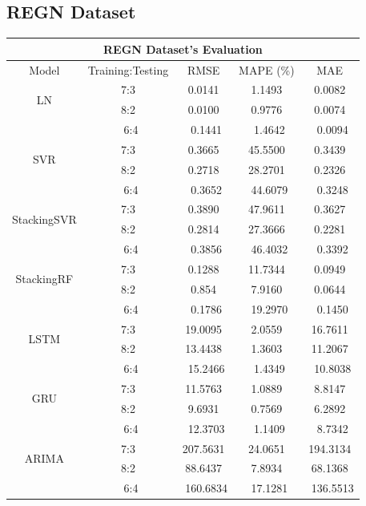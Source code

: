 \documentclass{ieeeojies}
\begin{document}
\subsection{REGN Dataset} 
\begin{table}[H]
    \centering
    \begin{tabular}{|c|c|c|c|c|}
         \hline
         \multicolumn{5}{|c|}{\textbf{REGN Dataset's Evaluation}}\\
         \hline
         \centering Model & Training:Testing & RMSE & MAPE (\%) & MAE\\
         \hline
         \multirow{2}{*}{LN} & 7:3 & 0.0141 & 1.1493 & 0.0082 \\ & 8:2 & 0.0100 & 0.9776 & 0.0074 \\ & \ 6:4} & \ 0.1441 & \ 1.4642 & \ 0.0094\\
         \hline
         \multirow{2}{*}{SVR} & 7:3 & 0.3665 & 45.5500 &  0.3439\\ & 8:2 & 0.2718 & 28.2701 & 0.2326 \\ & \ 6:4} & \ 0.3652 & \ 44.6079 & \ 0.3248\\
         \hline
         \multirow{2}{*}{StackingSVR} & 7:3 & 0.3890 & 47.9611 & 0.3627 \\ & 8:2 & 0.2814 & 27.3666 & 0.2281 \\ & \ 6:4} & \ 0.3856 & \ 46.4032 & \ 0.3392\\
          \hline
        \multirow{2}{*}{StackingRF} & 7:3 & 0.1288 & 11.7344 & 0.0949 \\ & 8:2 & 0.854 & 7.9160 & 0.0644 \\ & \ 6:4} & \ 0.1786 & \ 19.2970 & \ 0.1450\\
        \hline
         \multirow{2}{*}{LSTM} & 7:3 & 19.0095 & 2.0559 & 16.7611 \\ & 8:2 & 13.4438 & 1.3603 & 11.2067 \\ & \ 6:4} & \ 15.2466 & \ 1.4349 & \ 10.8038\\
         \hline
         \multirow{2}{*}{GRU} & 7:3 & 11.5763 & 1.0889 & 8.8147 \\ & 8:2 & 9.6931 & 0.7569 & 6.2892 \\ & \ 6:4} & \ 12.3703 & \ 1.1409 & \ 8.7342\\
         \hline
         \multirow{2}{*}{ARIMA} & 7:3 & 207.5631 & 24.0651 & 194.3134 \\ & 8:2 & 88.6437 & 7.8934 & 68.1368 \\ & \ 6:4} & \ 160.6834 & \ 17.1281 & \ 136.5513\\

\end{tabular}
\end{table}
\end{document}

